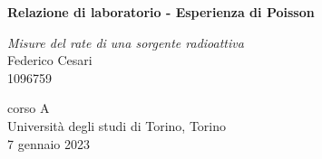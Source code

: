 \begin{titlepage}
   \begin{center}
       \vspace*{1cm}
        
       \textbf{\LARGE Relazione di laboratorio - Esperienza di Poisson}
       
       \vspace{0.3cm}
       \large \textit{Misure del rate di una sorgente radioattiva} \\
       
       \vspace{0.5cm}
       \Large Federico Cesari \\
       
       \small 1096759

			
		\vspace{1cm}
		\begin{center}
			
		\end{center}
		
		

       \vfill
            
       
            
       \vspace{0.8cm}
     
       
            
       corso A\\
       Università degli studi di Torino, Torino\\
       7 gennaio 2023\\
       
            
   \end{center}
\end{titlepage}
